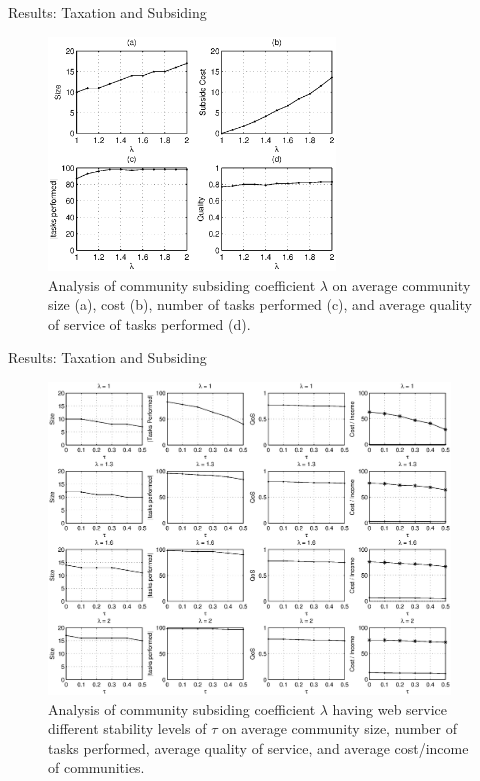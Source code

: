 \documentclass{beamer}
\begin{document}
\begin{frame}{Results: Taxation and Subsiding}
    \begin{figure}[!t]
        \centering
        \includegraphics[width=3in]{figures/taxtation.eps}
        \caption{Analysis of community subsiding coefficient $\lambda$ on
        average community size (a), cost (b), number of tasks performed
        (c), and average quality of service of tasks performed (d).}
        \label{f_taxtation}
    \end{figure}
\end{frame}

\begin{frame}{Results: Taxation and Subsiding}
    \begin{figure}[!t]
        \centerline{\includegraphics[width=4.2in]{figures/tax_dyn.eps}}
        \caption{Analysis of community subsiding coefficient $\lambda$
        having web service different stability levels of $\tau$ on average
        community size, number of tasks performed, average quality of
        service, and average cost/income of communities.}
        \label{fig_dynamic_taxtation}
    \end{figure}
\end{frame}
\end{document}
